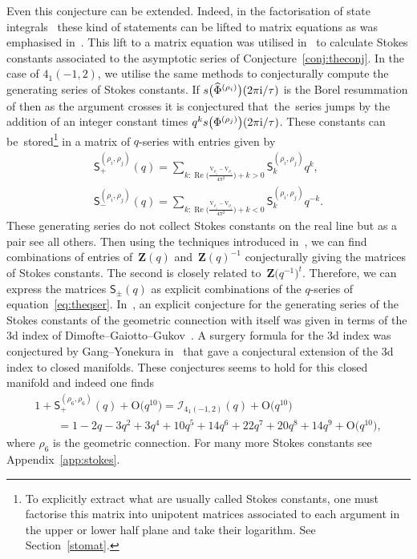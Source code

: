\documentclass[pdftex]{sigma}
\numberwithin{equation}{section}
\def\VC{\mathrm{VC}}
\def\Re{\operatorname{Re}}
\def\VC{\mathrm{V}}
\begin{document}
Even this conjecture can be extended. Indeed, in the factorisation of state integrals~\cite{GK:rat,GK:qser} these kind of statements can be lifted to matrix equations as was emphasised in~\cite{GZ:qser,GZ:RQMOD}. This lift to a matrix equation was utilised in~\cite{GGM:II,GGM:I,GGMW} to calculate Stokes constants associated to the asymptotic series of Conjecture~\ref{conj:theconj}. In the case of $4_{1}(-1,2)$, we utilise the same methods to conjecturally compute the generating series of Stokes constants. If $s\bigl(\widehat{\Phi}^{(\rho_{i})}\bigr)(2\pi {\rm i}/\tau)$ is the Borel resummation of  then as the argument crosses \smash{$\frac{\VC_{\rho_{j}}-\VC_{\rho_{i}}}{2\pi {\rm i}}+2\pi {\rm i}k$} it is conjectured that~the~series jumps by the addition of an integer constant times $q^{k}s\bigl(\Phi^{(\rho_{j})}\bigr)(2\pi {\rm i}/\tau)$. These constants can be~stored\footnote{To explicitly extract what are usually called Stokes constants, one must factorise this matrix into unipotent matrices associated to each argument in the upper or lower half plane and take their logarithm. See Section~\ref{stomat}.} in a matrix of $q$-series with entries given by
\begin{gather*}
 \mathsf{S}_{+}^{(\rho_i,\rho_j)}(q)
 =
 \sum_{k\colon \Re\bigl(\frac{\VC_{\rho_{j}}-\VC_{\rho_{i}}}{4\pi^2}\bigr)+k>0}\mathsf{S}^{(\rho_i,\rho_j)}_{k}q^{k},
 \\
 \mathsf{S}_{-}^{(\rho_i,\rho_j)}(q)
 =
 \sum_{k\colon \Re\bigl(\frac{\VC_{\rho_{j}}-\VC_{\rho_{i}}}{4\pi^2}\bigr)+k<0}\mathsf{S}^{(\rho_i,\rho_j)}_{k}q^{-k}.
\end{gather*}
These generating series do not collect Stokes constants on the real line but as a pair see all others.
Then using the techniques introduced in~\cite{GGM:I}, we can find combinations of entries of~$\mathbf{Z}(q)$ and~$\mathbf{Z}(q)^{-1}$ conjecturally giving the matrices of Stokes constants. The second is closely related to~$\mathbf{Z}\bigl(q^{-1}\bigr)^{t}$. Therefore, we can express the matrices $\mathsf{S}_{\pm}(q)$ as explicit combinations of the $q$-series of equation~\eqref{eq:theqser}.
In~\cite[Conjecture 2]{GGM:I},
an explicit conjecture for the generating series of the Stokes constants of the geometric connection with itself was given in terms of the 3d index of Dimofte--Gaiotto--Gukov~\cite{DGG}. A surgery formula for the 3d index was conjectured by Gang--Yonekura in~\cite{Gang3d} that gave a conjectural extension of the 3d index to closed manifolds. These conjectures seems to hold for this closed manifold and indeed one finds
\begin{gather*}
 1+\mathsf{S}_{+}^{(\rho_6,\rho_6)}(q)+\mathrm{O}\bigl(q^{10}\bigr)
  =
 \mathcal{I}_{4_{1}(-1,2)}(q)+\mathrm{O}\bigl(q^{10}\bigr)\\
 \qquad{} =
 1 - 2q - 3q^2 + 3q^4 + 10q^5 + 14q^6 + 22q^7 + 20q^8 + 14q^9+\mathrm{O}\bigl(q^{10}\bigr) ,
\end{gather*}
where $\rho_6$ is the geometric connection. For many more Stokes constants see Appendix~\ref{app:stokes}.
\end{document}
